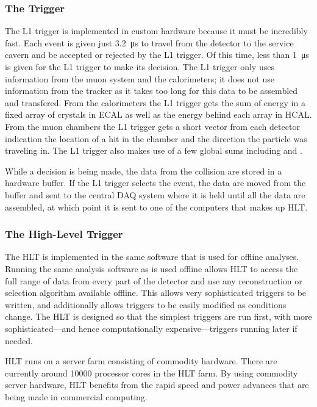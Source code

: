\subsubsection{The \texorpdfstring{\Lone}{Level-1} Trigger}

The L1 trigger is implemented in custom hardware because it must be incredibly
fast. Each event is given just \SI{3.2}{\micro\second} to travel from the
detector to the service cavern and be accepted or rejected by the L1 trigger.
Of this time, less than \SI{1}{\micro\second} is given for the L1 trigger to
make its decision. The L1 trigger only uses information from the muon system
and the calorimeters; it does not use information from the tracker as it takes
too long for this data to be assembled and transfered. From the calorimeters
the L1 trigger gets the sum of energy in a fixed array of \fivebyfive crystals
in ECAL as well as the energy behind each array in HCAL. From the muon chambers
the L1 trigger gets a short vector from each detector indication the location
of a hit in the chamber and the direction the particle was traveling in. The L1
trigger also makes use of a few global sums including \ET and \MET.

While a decision is being made, the data from the collision are stored in a
hardware buffer. If the L1 trigger selects the event, the data are moved from
the buffer and sent to the central DAQ system where it is held until all the
data are assembled, at which point it is sent to one of the computers that makes
up HLT.

\subsubsection{The High-Level Trigger}

The HLT is implemented in the same software that is used for offline analyses.
Running the same analysis software as is used offline allows HLT to access the
full range of data from every part of the detector and use any reconstruction
or selection algorithm available offline. This allows very sophisticated
triggers to be written, and additionally allows triggers to be easily modified
as conditions change. The HLT is designed so that the simplest triggers are run
first, with more sophisticated---and hence computationally expensive---triggers
running later if needed.

HLT runs on a server farm consisting of commodity hardware. There are currently
around \num{10000} processor cores in the HLT farm. By using commodity server
hardware, HLT benefits from the rapid speed and power advances that are being
made in commercial computing.
